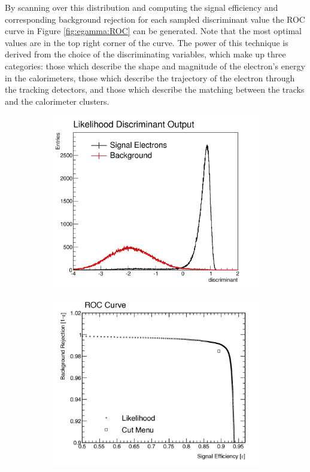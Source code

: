 By scanning over this distribution and computing the signal efficiency and corresponding background rejection for each sampled discriminant value the ROC curve in Figure \ref{fig:egamma:ROC} can be generated.
Note that the most optimal values are in the top right corner of the curve.  
The power of this technique is derived from the choice of the discriminating variables, which make up three categories: those which describe the shape and magnitude of the electron's energy in the calorimeters, those which describe the trajectory of the electron through the tracking detectors, and those which describe the matching between the tracks and the calorimeter clusters.  
\begin{figure}[t]
\centering
    \begin{subfigure}[b]{0.49\textwidth}
      \centering
      \includegraphics[width=1.0\textwidth]{figs/egamma/example_lh_output.png}
      \caption{}
      \label{fig:egamma:discriminant}
    \end{subfigure}
    \hfill
    \begin{subfigure}[b]{0.49\textwidth}
      \centering
      \includegraphics[width=1.0\textwidth]{figs/egamma/ROC.png}

\end{subfigure}
\end{figure}
